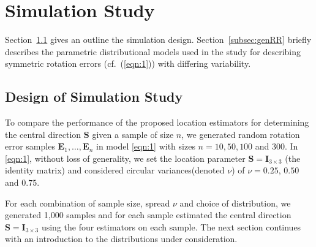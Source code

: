 \section{Simulation Study}\label{ch:simulation}

Section~\ref{subsec:simdesign} gives an outline the simulation design.  Section~\ref{subsec:genRR} briefly describes the parametric distributional models used in the study for describing symmetric rotation errors (cf.~(\ref{eqn:1})) with differing variability. 


\subsection{Design of Simulation Study}
\label{subsec:simdesign}
To compare the performance of the proposed location estimators for determining the central direction $\bm{S}$ given a sample of size $n$, we generated random rotation error samples  $\bm E_1, \ldots, \bm E_n$  in model \eqref{eqn:1} with sizes $n=10, 50, 100$ and 300. In \eqref{eqn:1}, without loss of generality, we set the location parameter $\bm S=\bm I_{3\times 3}$ (the identity matrix) and considered circular variances(denoted $\nu$) of $\nu=0.25$, $0.50$ and $0.75$. 

For each combination of sample size, spread $\nu$ and choice of distribution, we generated 1,000 samples and for each sample estimated the central direction  $\bm S=\bm I_{3\times 3}$ using the four estimators on each sample.  The next section continues with an introduction to the distributions under consideration.


